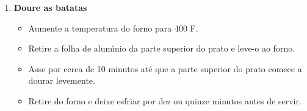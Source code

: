 \documentclass [11pt, letterpaper] {article}
\newcommand \fileName {ScallopedPotatoes}
\begin{document}
\begin {description}
\begin {enumerate}
\begin {itemize}
		\item Coloque uma pequena quantidade de molho no fundo da assadeira.
		\item Espalhe uma camada de batatas fatiadas e espalhe um pouco de molho por cima dessa camada. Voc\^e quer ter molho suficiente para cobrir completamente o topo do prato com uma espessa camada de molho.
		\item Pulverize uma folha de papel alum\'{\i}nio com spray de cozinha e ensopado.
		\item Asse por pelo menos uma hora, ou at\'e que uma pequena faca afiada perfure facilmente as fatias de batata no centro do prato.
		\end {itemize}
	\item {\bf Doure as batatas}
		\begin {itemize}
        		\item Aumente a temperatura do forno para 400 F.
		\item Retire a folha de alum\'{\i}nio da parte superior do prato e leve-o ao forno.
		\item Asse por cerca de 10 minutos at\'e que a parte superior do prato comece a dourar levemente.
		\item Retire do forno e deixe esfriar por dez ou quinze minutos antes de servir.
		\end{itemize}
     	\end{enumerate}         
\end{description}

\end{document}
